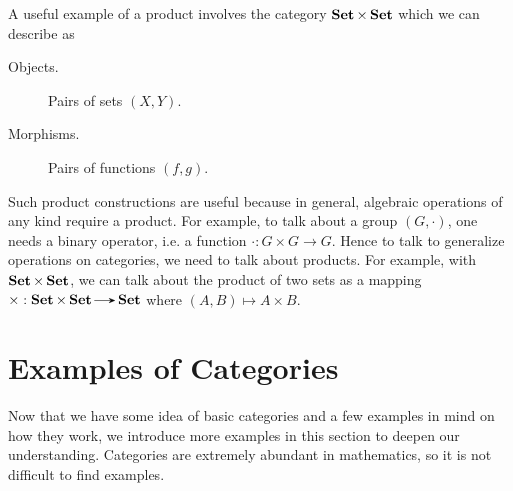     \begin{example}
        A useful example of a product involves the category $\operatorname{\mathbf{Set}}\times\operatorname{\mathbf{Set}}$ which 
        we can describe as 
        \begin{description}
            \item[Objects.] Pairs of sets $(X, Y)$.
            \item[Morphisms.] Pairs of functions $(f, g)$. 
        \end{description}
        Such product constructions are useful because in general, algebraic operations of any kind 
        require a product. For example, to talk about a group $(G, \cdot)$, 
        one needs a binary operator, i.e. a function $\cdot: G \times G \to G$.
        Hence to talk to generalize operations on categories, we need to talk about products. 
        For example, with $\operatorname{\mathbf{Set}}\times\operatorname{\mathbf{Set}}$, we can talk about the product of two sets 
        as a mapping $\times: \Set \times \Set \to \Set$ where $(A, B) \mapsto A \times B$. 
    \end{example}










    \newpage
    \section{Examples of Categories}

    Now that we have some idea of basic categories and a few examples in mind on 
    how they work, we introduce more examples in this section to deepen our understanding.
    Categories are extremely abundant in mathematics, so it is not difficult to 
    find examples.

